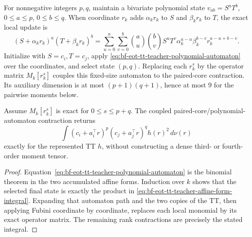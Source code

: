 For nonnegative integers \(p,q\), maintain a bivariate polynomial state
\(v_{ab}=S^aT^b\), \(0\leq a\leq p\), \(0\leq b\leq q\).  When coordinate
\(r_k\) adds \(\alpha_kr_k\) to \(S\) and \(\beta_kr_k\) to \(T\), the exact
local update is
\begin{equation}
 (S+\alpha_kr_k)^a(T+\beta_kr_k)^b
 =\sum_{u=0}^a\sum_{v=0}^b
   \binom{a}{u}\binom{b}{v}S^uT^v
   \alpha_k^{a-u}\beta_k^{b-v}r_k^{a-u+b-v}.
 \label{eq:bf-eot-tt-teacher-polynomial-automaton}
\end{equation}
Initialize with \(S=c_i,T=c_j\), apply
\eqref{eq:bf-eot-tt-teacher-polynomial-automaton} over the coordinates, and
select state \((p,q)\).  Replacing each \(r_k^s\) by the operator matrix
\(M_k[r_k^s]\) couples this fixed-size automaton to the paired-core
contraction.  Its auxiliary dimension is at most \((p+1)(q+1)\), hence at most
9 for the pairwise moments below.

\begin{proposition}
\label{prop:bf-eot-tt-teacher-affine-form-moments}
Assume \(M_k[r_k^s]\) is exact for \(0\leq s\leq p+q\).  The coupled
paired-core/polynomial-automaton contraction returns
\begin{equation}
 \int (c_i+a_i^\top r)^p(c_j+a_j^\top r)^q h(r)^2\,d\nu(r)
 \label{eq:bf-eot-tt-teacher-affine-form-integral}
\end{equation}
exactly for the represented TT \(h\), without constructing a dense third- or
fourth-order moment tensor.
\end{proposition}

\begin{proof}
Equation~\eqref{eq:bf-eot-tt-teacher-polynomial-automaton} is the binomial
theorem in the two accumulated affine forms.  Induction over \(k\) shows that
the selected final state is exactly the product in
\eqref{eq:bf-eot-tt-teacher-affine-form-integral}.  Expanding that automaton
path and the two copies of the TT, then applying Fubini coordinate by
coordinate, replaces each local monomial by its exact operator matrix.  The
remaining rank contractions are precisely the stated integral.
\end{proof}

